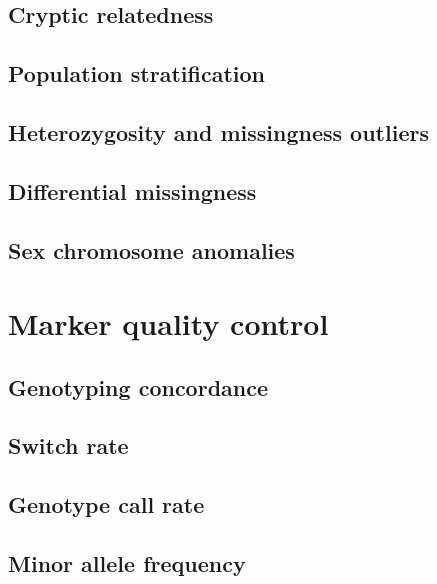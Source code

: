 \documentclass[]{book}
\theoremstyle{definition}
\theoremstyle{definition}
\theoremstyle{definition}
\theoremstyle{remark}
\begin{document}
\subsection{Cryptic relatedness}\label{cryptic-relatedness}

\subsection{Population stratification}\label{population-stratification}

\subsection{Heterozygosity and missingness
outliers}\label{heterozygosity-and-missingness-outliers}

\subsection{Differential missingness}\label{differential-missingness}

\subsection{Sex chromosome anomalies}\label{sex-chromosome-anomalies}

\section{Marker quality control}\label{marker-quality-control}

\subsection{Genotyping concordance}\label{genotyping-concordance}

\subsection{Switch rate}\label{switch-rate}

\subsection{Genotype call rate}\label{genotype-call-rate}

\subsection{Minor allele frequency}\label{minor-allele-frequency}
\end{document}
